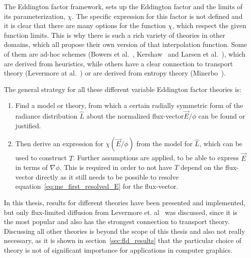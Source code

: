 The Eddington factor framework, sets up the Eddington factor and the limits of its parameterization, $\chi$. The specific expression for this factor is not defined and it is clear that there are many options for the function $\chi$, which respect the given function limits. This is why there is such a rich variety of theories in other domains, which all propose their own version of that interpolation function. Some of them are ad-hoc schemes (Bowers et al.~\cite{Bowers82}, Kershaw~\cite{Kershaw76} and Larsen et al.~\cite{Larsen74}), which are derived from heuristics, while others have a clear connection to transport theory (Levermore at al.~\cite{Levermore81}) or are derived from entropy theory (Minerbo~\cite{Minerbo78}).

The general strategy for all these different variable Eddington factor theories is:
\begin{enumerate}
\item Find a model or theory, from which a certain radially symmetric form of the radiance distribution $\hat{L}$ about the normalized flux-vector$\vec{E}/\phi$ can be found or justified.
\item Then derive an expression for $\chi(\vec{E}/\phi)$ from the model for $\hat{L}$, which can be used to construct $T$. Further assumptions are applied, to be able to express $\vec{E}$ in terms of $\nabla\phi$. This is required in order to not have $T$ depend on the flux-vector directly as it still needs to be possible to resolve equation~\ref{eq:me_first_resolved_E} for the flux-vector.
\end{enumerate}

In this thesis, results for different theories have been presented and implemented, but only flux-limited diffusion from Levermore et. al~\cite{Levermore81} was discussed, since it is the most popular and also has the strongest connection to transport theory. Discussing all other theories is beyond the scope of this thesis and also not really necessary, as it is shown in section~\ref{sec:fld_results} that the particular choice of theory is not of significant importance for applications in computer graphics.